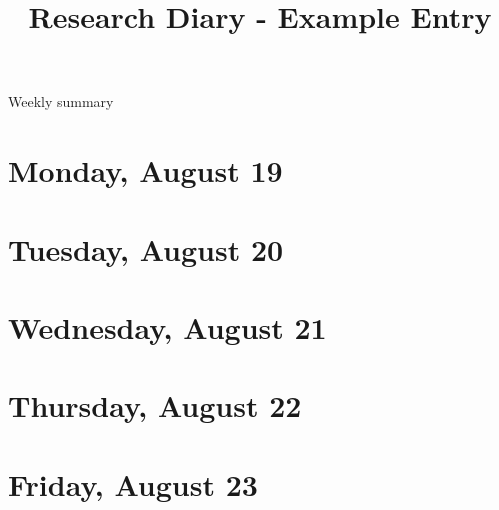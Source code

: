\documentclass[11pt,letterpaper]{article}
\begin{document}
\univlogo

\title{Research Diary - Example Entry}

{\Huge Weekly summary}\\[5mm]

\section*{Monday, August 19}

\section*{Tuesday, August 20}

\section*{Wednesday, August 21}

\section*{Thursday, August 22}

\section*{Friday, August 23}

\printbibliography
\end{document}
